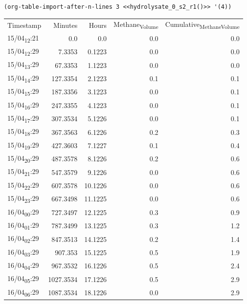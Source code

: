 \documentclass[11pt]{article}
\begin{document}
\begin{verbatim}
(org-table-import-after-n-lines 3 <<hydrolysate_0_s2_r1()>> '(4))
\end{verbatim}

\begin{center}
\begin{tabular}{lrrrr}
Timestamp & Minutes & Hours & Methane\textsubscript{Volume} & Cumulative\textsubscript{Methane}\textsubscript{Volume}\\[0pt]
15/04\textsubscript{12}:21 & 0.0 & 0.0 & 0.0 & 0.0\\[0pt]
15/04\textsubscript{12}:29 & 7.3353 & 0.1223 & 0.0 & 0.0\\[0pt]
15/04\textsubscript{13}:29 & 67.3353 & 1.1223 & 0.0 & 0.0\\[0pt]
15/04\textsubscript{14}:29 & 127.3354 & 2.1223 & 0.1 & 0.1\\[0pt]
15/04\textsubscript{15}:29 & 187.3356 & 3.1223 & 0.0 & 0.1\\[0pt]
15/04\textsubscript{16}:29 & 247.3355 & 4.1223 & 0.0 & 0.1\\[0pt]
15/04\textsubscript{17}:29 & 307.3534 & 5.1226 & 0.0 & 0.1\\[0pt]
15/04\textsubscript{18}:29 & 367.3563 & 6.1226 & 0.2 & 0.3\\[0pt]
15/04\textsubscript{19}:29 & 427.3603 & 7.1227 & 0.1 & 0.4\\[0pt]
15/04\textsubscript{20}:29 & 487.3578 & 8.1226 & 0.2 & 0.6\\[0pt]
15/04\textsubscript{21}:29 & 547.3579 & 9.1226 & 0.0 & 0.6\\[0pt]
15/04\textsubscript{22}:29 & 607.3578 & 10.1226 & 0.0 & 0.6\\[0pt]
15/04\textsubscript{23}:29 & 667.3498 & 11.1225 & 0.0 & 0.6\\[0pt]
16/04\textsubscript{00}:29 & 727.3497 & 12.1225 & 0.3 & 0.9\\[0pt]
16/04\textsubscript{01}:29 & 787.3499 & 13.1225 & 0.3 & 1.2\\[0pt]
16/04\textsubscript{02}:29 & 847.3513 & 14.1225 & 0.2 & 1.4\\[0pt]
16/04\textsubscript{03}:29 & 907.353 & 15.1225 & 0.5 & 1.9\\[0pt]
16/04\textsubscript{04}:29 & 967.3532 & 16.1226 & 0.5 & 2.4\\[0pt]
16/04\textsubscript{05}:29 & 1027.3534 & 17.1226 & 0.5 & 2.9\\[0pt]
16/04\textsubscript{06}:29 & 1087.3534 & 18.1226 & 0.0 & 2.9\\[0pt]

\end{tabular}
\end{center}
\end{document}
